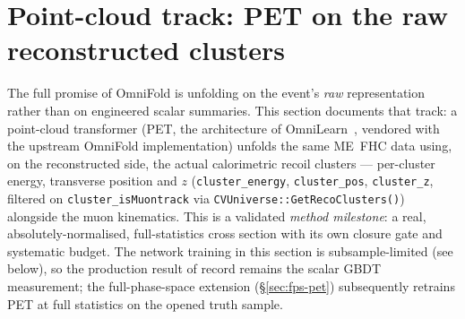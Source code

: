 \section{Point-cloud track: PET on the raw reconstructed clusters}
\label{sec:pet}

The full promise of OmniFold is unfolding on the event's \emph{raw}
representation rather than on engineered scalar summaries. This section
documents that track: a point-cloud transformer (PET, the architecture of
OmniLearn~\cite{Mikuni:2024qsr}, vendored with the upstream OmniFold
implementation) unfolds the same ME~FHC data using, on the reconstructed
side, the actual calorimetric recoil clusters --- per-cluster energy,
transverse position and $z$ (\texttt{cluster\_energy}, \texttt{cluster\_pos},
\texttt{cluster\_z}, filtered on \texttt{cluster\_isMuontrack} via
\texttt{CVUniverse::GetRecoClusters()}) alongside the muon kinematics. This
is a validated \emph{method milestone}: a real, absolutely-normalised,
full-statistics cross section with its own closure gate and systematic
budget. The network training in this section is subsample-limited (see
below), so the production result of record remains the scalar GBDT
measurement; the full-phase-space extension (\S\ref{sec:fps-pet})
subsequently retrains PET at full statistics on the opened truth sample.


